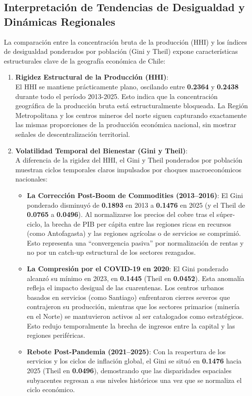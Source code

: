 \documentclass[11pt,a4paper]{article}
\begin{document}
\subsection{Interpretación de Tendencias de Desigualdad y Dinámicas Regionales}

La comparación entre la concentración bruta de la producción (HHI) y los índices de desigualdad ponderados por población (Gini y Theil) expone características estructurales clave de la geografía económica de Chile:

\begin{enumerate}
    \item \textbf{Rigidez Estructural de la Producción (HHI)}:\\
    El HHI se mantiene prácticamente plano, oscilando entre \textbf{0.2364} y \textbf{0.2438} durante todo el período 2013-2025. Esto indica que la concentración geográfica de la producción bruta está estructuralmente bloqueada. La Región Metropolitana y los centros mineros del norte siguen capturando exactamente las mismas proporciones de la producción económica nacional, sin mostrar señales de descentralización territorial.

    \item \textbf{Volatilidad Temporal del Bienestar (Gini y Theil)}:\\
    A diferencia de la rigidez del HHI, el Gini y Theil ponderados por población muestran ciclos temporales claros impulsados por choques macroeconómicos nacionales:
    \begin{itemize}
        \item \textbf{La Corrección Post-Boom de Commodities (2013–2016)}: El Gini ponderado disminuyó de \textbf{0.1893} en 2013 a \textbf{0.1476} en 2025 (y el Theil de \textbf{0.0765} a \textbf{0.0496}). Al normalizarse los precios del cobre tras el súper-ciclo, la brecha de PIB per cápita entre las regiones ricas en recursos (como Antofagasta) y las regiones agrícolas o de servicios se comprimió. Esto representa una ``convergencia pasiva'' por normalización de rentas y no por un catch-up estructural de los sectores rezagados.
        \item \textbf{La Compresión por el COVID-19 en 2020}: El Gini ponderado alcanzó su mínimo en 2023, en \textbf{0.1445} (Theil en \textbf{0.0452}). Esta anomalía refleja el impacto desigual de las cuarentenas. Los centros urbanos basados en servicios (como Santiago) enfrentaron cierres severos que contrajeron su producción, mientras que los sectores primarios (minería en el Norte) se mantuvieron activos al ser catalogados como estratégicos. Esto redujo temporalmente la brecha de ingresos entre la capital y las regiones periféricas.
        \item \textbf{Rebote Post-Pandemia (2021–2025)}: Con la reapertura de los servicios y los ciclos de inflación global, el Gini se situó en \textbf{0.1476} hacia 2025 (Theil en \textbf{0.0496}), demostrando que las disparidades espaciales subyacentes regresan a sus niveles históricos una vez que se normaliza el ciclo económico.
    \end{itemize}


\end{enumerate}
\end{document}
